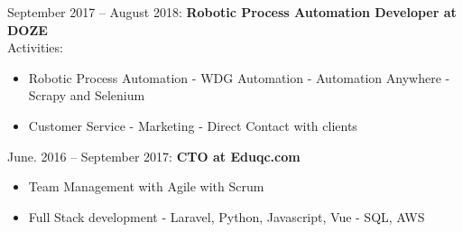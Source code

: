 \documentclass{tccv_full}
\begin{document}
	\vspace{0.7cm}
	{\large September 2017 -- August 2018:
	\textbf{Robotic Process Automation Developer at DOZE}\\}
	Activities:
	\begin{itemize}
		\item \textsf{Robotic Process Automation}
			{\small 
			\subitem - WDG Automation 
			\subitem - Automation Anywhere
			\subitem - Scrapy and Selenium
			}
		
		\item \textsf{Customer Service}
			{\small 
			\subitem - Marketing
			\subitem - Direct Contact with clients
			}
		
	\end{itemize}
	
	\vspace{0.7cm}
	{\large June. 2016 -- September 2017: \textbf{CTO at Eduqc.com}\\}
	\begin{itemize}
		\item \textsf{Team Management with Agile with Scrum}
		\item \textsf{Full Stack development}
		{\small 
		\subitem - Laravel, Python, Javascript, Vue
		\subitem - SQL, AWS }
	\end{itemize}
	
\end{document}
